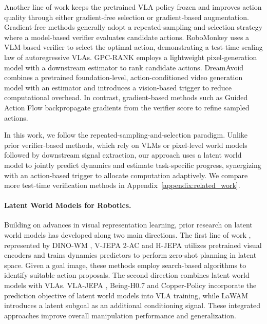 \documentclass[10pt,twocolumn,letterpaper]{article}
\begin{document}
Another line of work keeps the pretrained VLA policy frozen and improves action quality through either gradient-free selection or gradient-based augmentation. Gradient-free methods \cite{xu2026vgasvalueguidedactionchunkselection} generally adopt a repeated-sampling-and-selection strategy where a model-based verifier evaluates candidate actions. RoboMonkey \cite{kwok2025robomonkeyscalingtesttimesampling} uses a VLM-based verifier to select the optimal action, demonstrating a test-time scaling law of autoregressive VLAs.  GPC-RANK \cite{qi2026inferencetimeenhancementgenerativerobot} employs a lightweight pixel-generation model with a downstream estimator to rank candidate actions. DreamAvoid \cite{fan2026dreamavoidcriticalphasetesttimedreaming} combines a pretrained foundation-level, action-conditioned video generation model with an estimator and introduces a vision-based trigger to reduce computational overhead. In contrast, gradient-based methods such as Guided Action Flow \cite{yang2026guidedactionflowqguided} backpropagate gradients from the verifier score to refine sampled actions.

In this work, we follow the repeated-sampling-and-selection paradigm. Unlike prior verifier-based methods, which rely on VLMs or pixel-level world models followed by downstream signal extraction, our approach uses a latent world model to jointly predict dynamics and estimate task-specific progress, synergizing with an action-based trigger to allocate computation adaptively. We compare more test-time verification methods in Appendix~\ref{appendix:related_work}.

\vspace{-3pt}
\paragraph{Latent World Models for Robotics.}
Building on advances in visual representation learning, prior research on latent world models has developed along two main directions. The first line of work \cite{sobal2025learningrewardfreeofflinedata,maes2026leworldmodelstableendtoendjointembedding,zhang2026hierarchicalplanninglatentworld}, represented by DINO-WM \cite{zhou2025dinowmworldmodelspretrained}, V-JEPA 2-AC \cite{assran2025vjepa2selfsupervisedvideo} and H-JEPA \cite{zhang2026hjepaendtoendlearninghierarchical} utilizes pretrained visual encoders and trains dynamics predictors to perform zero-shot planning in latent space. Given a goal image, these methods employ search-based algorithms to identify suitable action proposals. The second direction combines latent world models with VLAs. VLA-JEPA \cite{sun2026vlajepaenhancingvisionlanguageactionmodel}, Being-H0.7 \cite{luo2026beingh07latentworldactionmodel} and Copper-Policy \cite{feng2026copperpolicyfocusrepresentationrobust} incorporate the prediction objective of latent world models into VLA training, while LaWAM \cite{chen2026lawamlatentworldaction} introduces a latent subgoal as an additional conditioning signal. These integrated approaches improve overall manipulation performance and generalization.
\end{document}
